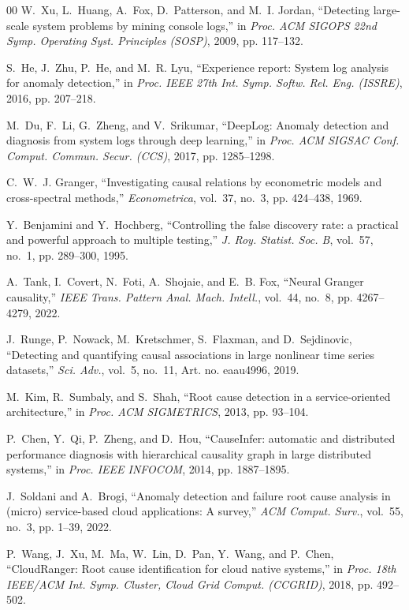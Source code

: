 \documentclass[conference,a4paper]{IEEEtran}
\begin{document}
\begin{thebibliography}{00}
W.~Xu, L.~Huang, A.~Fox, D.~Patterson, and M.~I. Jordan, ``Detecting
large-scale system problems by mining console logs,'' in \emph{Proc. ACM
SIGOPS 22nd Symp. Operating Syst. Principles (SOSP)}, 2009, pp. 117--132.

S.~He, J.~Zhu, P.~He, and M.~R. Lyu, ``Experience report: System log analysis
for anomaly detection,'' in \emph{Proc. IEEE 27th Int. Symp. Softw. Rel. Eng.
(ISSRE)}, 2016, pp. 207--218.

M.~Du, F.~Li, G.~Zheng, and V.~Srikumar, ``DeepLog: Anomaly detection and
diagnosis from system logs through deep learning,'' in \emph{Proc. ACM SIGSAC
Conf. Comput. Commun. Secur. (CCS)}, 2017, pp. 1285--1298.

C.~W.~J. Granger, ``Investigating causal relations by econometric models and
cross-spectral methods,'' \emph{Econometrica}, vol.~37, no.~3, pp. 424--438,
1969.

Y.~Benjamini and Y.~Hochberg, ``Controlling the false discovery rate: a
practical and powerful approach to multiple testing,'' \emph{J. Roy. Statist.
Soc. B}, vol.~57, no.~1, pp. 289--300, 1995.

A.~Tank, I.~Covert, N.~Foti, A.~Shojaie, and E.~B. Fox, ``Neural Granger
causality,'' \emph{IEEE Trans. Pattern Anal. Mach. Intell.}, vol.~44,
no.~8, pp. 4267--4279, 2022.

J.~Runge, P.~Nowack, M.~Kretschmer, S.~Flaxman, and D.~Sejdinovic, ``Detecting
and quantifying causal associations in large nonlinear time series datasets,''
\emph{Sci. Adv.}, vol.~5, no.~11, Art. no. eaau4996, 2019.

M.~Kim, R.~Sumbaly, and S.~Shah, ``Root cause detection in a service-oriented
architecture,'' in \emph{Proc. ACM SIGMETRICS}, 2013, pp. 93--104.

P.~Chen, Y.~Qi, P.~Zheng, and D.~Hou, ``CauseInfer: automatic and distributed
performance diagnosis with hierarchical causality graph in large distributed
systems,'' in \emph{Proc. IEEE INFOCOM}, 2014, pp. 1887--1895.

J.~Soldani and A.~Brogi, ``Anomaly detection and failure root cause analysis
in (micro) service-based cloud applications: A survey,'' \emph{ACM Comput.
Surv.}, vol.~55, no.~3, pp. 1--39, 2022.

P.~Wang, J.~Xu, M.~Ma, W.~Lin, D.~Pan, Y.~Wang, and P.~Chen, ``CloudRanger:
Root cause identification for cloud native systems,'' in \emph{Proc. 18th
IEEE/ACM Int. Symp. Cluster, Cloud Grid Comput. (CCGRID)}, 2018,
pp. 492--502.


\end{thebibliography}
\end{document}
